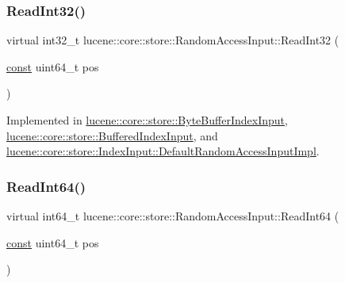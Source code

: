 \subsubsection{\texorpdfstring{Read\+Int32()}{ReadInt32()}}
{\footnotesize\ttfamily virtual int32\+\_\+t lucene\+::core\+::store\+::\+Random\+Access\+Input\+::\+Read\+Int32 (\begin{DoxyParamCaption}\item[{\mbox{\hyperlink{ZlibCrc32_8h_a2c212835823e3c54a8ab6d95c652660e}{const}} uint64\+\_\+t}]{pos }\end{DoxyParamCaption})\hspace{0.3cm}{\ttfamily [pure virtual]}}



Implemented in \mbox{\hyperlink{classlucene_1_1core_1_1store_1_1ByteBufferIndexInput_a4d633d98060b140f8e416c3178ae842f}{lucene\+::core\+::store\+::\+Byte\+Buffer\+Index\+Input}}, \mbox{\hyperlink{classlucene_1_1core_1_1store_1_1BufferedIndexInput_a4c42570e52badebd5d2bd847611c6a31}{lucene\+::core\+::store\+::\+Buffered\+Index\+Input}}, and \mbox{\hyperlink{classlucene_1_1core_1_1store_1_1IndexInput_1_1DefaultRandomAccessInputImpl_ac0bceb35a848e41d25f1982c5fae5808}{lucene\+::core\+::store\+::\+Index\+Input\+::\+Default\+Random\+Access\+Input\+Impl}}.

\mbox{\label{classlucene_1_1core_1_1store_1_1RandomAccessInput_abb5d56744a927492a2dc0cf0bc8407b3}} 
\subsubsection{\texorpdfstring{Read\+Int64()}{ReadInt64()}}
{\footnotesize\ttfamily virtual int64\+\_\+t lucene\+::core\+::store\+::\+Random\+Access\+Input\+::\+Read\+Int64 (\begin{DoxyParamCaption}\item[{\mbox{\hyperlink{ZlibCrc32_8h_a2c212835823e3c54a8ab6d95c652660e}{const}} uint64\+\_\+t}]{pos }\end{DoxyParamCaption})\hspace{0.3cm}{\ttfamily [pure virtual]}}



